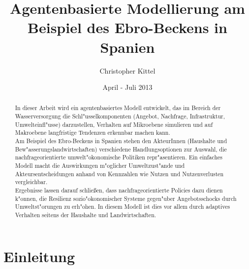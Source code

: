 \documentclass[11pt,a4paper]{article}
\title{Agentenbasierte Modellierung am Beispiel des Ebro-Beckens in Spanien}
\author{Christopher Kittel}
\date{April - Juli 2013}
\begin{document}
\maketitle


\begin{abstract}
In dieser Arbeit wird ein agentenbasiertes Modell entwickelt, das im Bereich der Wasserversorgung die Schl"usselkomponenten (Angebot, Nachfrage, Infrastruktur, Umwelteinfl"usse) darzustellen, Verhalten auf Mikro\-ebene simulieren und auf Makroebene langfristige Tendenzen erkennbar machen kann.\\
Am Beispiel des Ebro-Beckens in Spanien stehen den AkteurInnen (Haushalte und Bew"asserungslandwirtschaften) verschiedene Handlungsoptionen zur Auswahl, die nachfrageorientierte umwelt"okonomische Politiken repr"asentieren. Ein einfaches Modell macht die Auswirkungen m"oglicher Umweltzust"ande und Akteursentscheidungen anhand von Kennzahlen wie Nutzen und Nutzenverlusten vergleichbar. \\
Ergebnisse lassen darauf schließen, dass nachfrageorientierte Policies dazu dienen k"onnen, die Resilienz sozio"okonomischer Systeme gegen"uber Angebotsschocks durch Umweltst"orungen zu erh"ohen. In diesem Modell ist dies vor allem durch adaptives Verhalten seitens der Haushalte und Landwirtschaften.
\end{abstract}


\newpage


\section{Einleitung}
\end{document}
